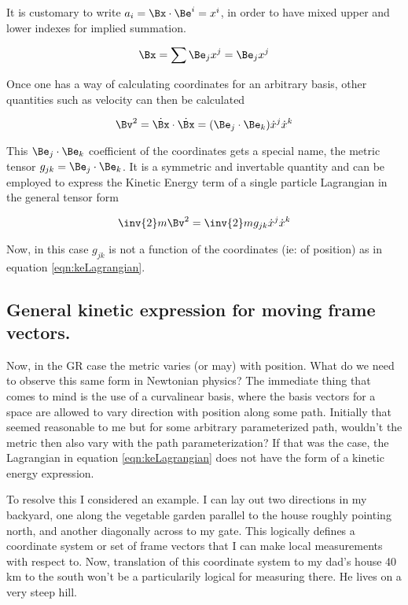 \documentclass{article}      %
\newcommand{\xdot}[0]{\dot{x}}
\begin{document}
It is customary to write $a_i = \Bx \cdot \Be^i = x^i$, in order to have
mixed upper and lower indexes for implied summation.

\begin{equation*}
\Bx = \sum \Be_j x^j = \Be_j x^j
\end{equation*}

Once one has a way of calculating coordinates for an arbitrary basis, other quantities such as velocity
can then be calculated

\begin{equation*}
\Bv^2 = \dot{\Bx} \cdot \dot{\Bx} = (\Be_j \cdot \Be_k) \xdot^j \xdot^k
\end{equation*}

This
$\Be_j \cdot \Be_k$ coefficient of the coordinates
gets a special name, the metric tensor
$g_{j k} = \Be_j \cdot \Be_k$.  It is a symmetric and invertable quantity and can be employed to 
express the Kinetic Energy term of a single particle Lagrangian in the general tensor form 

\begin{equation*}
\inv{2} m \Bv^2 = \inv{2} m g_{j k} \xdot^j \xdot^k
\end{equation*}

Now, in this case $g_{j k}$ is not a function of the coordinates (ie: of position) as in
equation \ref{eqn:keLagrangian}.

\subsection{ General kinetic expression for moving frame vectors. }

Now, in the GR case the metric varies (or may) with position.  What do we need to observe this same form in Newtonian
physics?  The immediate thing that comes to mind is the use of a curvalinear basis, where the basis vectors
for a space are allowed to vary direction with position along some path.  Initially that seemed reasonable to
me but for some arbitrary parameterized path, wouldn't the metric then also vary with the path parameterization?  If that
was the case, the Lagrangian in equation \ref{eqn:keLagrangian} does not have the form of a kinetic energy expression.

To resolve this I considered an example.  I can lay out two directions in my backyard, one along the vegetable garden
parallel to the house roughly pointing north, and another diagonally across to my gate.  This logically defines a coordinate
system or set of frame vectors that I can make local measurements with respect to.
Now, translation of this coordinate system
to my dad's house 40 km to the south won't be a particularily logical for measuring there.  He lives on a very 
steep hill.
\end{document}
